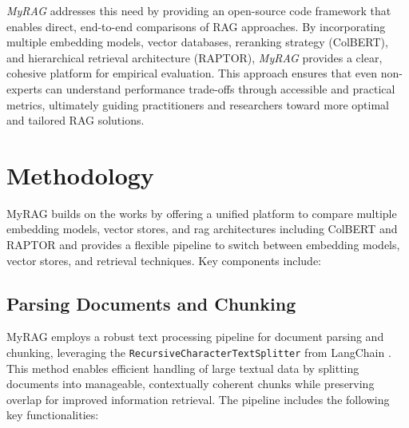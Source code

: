 \documentclass{scrartcl}
\begin{document}
\textit{MyRAG} addresses this need by providing an open-source code framework that enables direct, end-to-end comparisons of RAG approaches. By incorporating multiple embedding models, vector databases, reranking strategy (ColBERT), and hierarchical retrieval architecture (RAPTOR), \textit{MyRAG} provides a clear, cohesive platform for empirical evaluation. This approach ensures that even non-experts can understand performance trade-offs through accessible and practical metrics, ultimately guiding practitioners and researchers toward more optimal and tailored RAG solutions.
\section{Methodology}
MyRAG builds on the works by offering a unified platform to compare multiple embedding models, vector stores, and rag architectures including ColBERT and RAPTOR and provides a flexible pipeline to switch between embedding models, vector stores, and retrieval techniques. Key components include:

\subsection{Parsing Documents and Chunking}

MyRAG employs a robust text processing pipeline for document parsing and chunking, leveraging the \texttt{RecursiveCharacterTextSplitter} from LangChain \cite{langchain2024}. This method enables efficient handling of large textual data by splitting documents into manageable, contextually coherent chunks while preserving overlap for improved information retrieval. The pipeline includes the following key functionalities:
\end{document}
